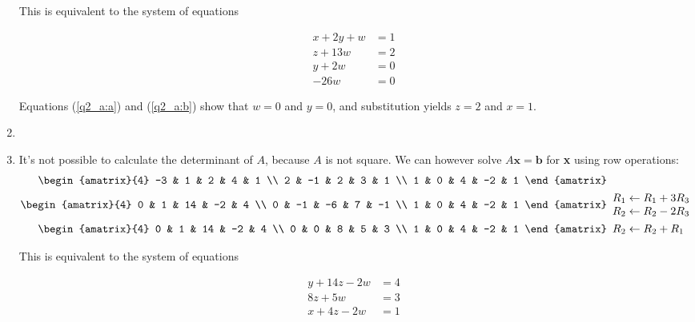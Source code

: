\documentclass{article}
\begin{document}
\begin{enumerate}
This is equivalent to the system of equations

\begin{align}
 x + 2y + w &= 1 \nonumber \\
 z + 13w &= 2 \nonumber \\
 y + 2w &= 0 \label{q2_a:a} \\
 -26w &= 0 \label{q2_a:b}
\end{align}

Equations (\ref{q2_a:a}) and (\ref{q2_a:b}) show that $w = 0$ and
$y = 0$, and substitution yields $z = 2$ and $x = 1$.

\item
\BEN
\item
It's not possible to calculate the determinant of $A$, because $A$ is not square. We can however solve $A\mathbf{x}=\mathbf{b}$ for \textbf{x} using row operations:
\begin{align}
 \begin{amatrix}{4}
  -3 &  1 & 2 &  4 & 1 \\
   2 & -1 & 2 &  3 & 1 \\
   1 &  0 & 4 & -2 & 1
 \end{amatrix}&
 \nonumber \\
 \begin{amatrix}{4}
  0 &  1 & 14 & -2 &  4 \\
  0 & -1 & -6 &  7 & -1 \\
  1 &  0 &  4 & -2 &  1
 \end{amatrix}&
 \begin{array}{l}
  R_1 \leftarrow R_1 + 3R_3 \\ R_2 \leftarrow R_2 - 2R_3
 \end{array}
 \nonumber \\
 \begin{amatrix}{4}
  0 & 1 & 14 & -2 & 4 \\
  0 & 0 &  8 &  5 & 3 \\
  1 & 0 &  4 & -2 & 1
 \end{amatrix}&
 \begin{array}{l}
  R_2 \leftarrow R_2 + R_1
 \end{array}
 \nonumber
\end{align}

This is equivalent to the system of equations

\begin{align}
 y + 14z -2w &= 4 \label{asdfasdf} \\
 8z + 5w &= 3 \label{qwerqwer} \\
 x + 4z -2w &= 1 \label{zxcvzxcv}
\end{align}


\end{enumerate}
\end{document}
